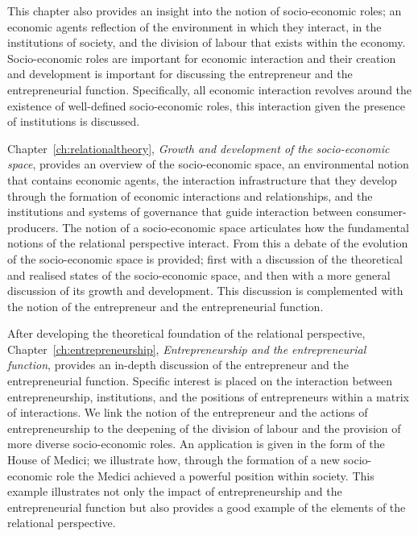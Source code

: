 This chapter also provides an insight into the notion of socio-economic roles; an economic agents reflection of the environment in which they interact, in the institutions of society, and the division of labour that exists within the economy. Socio-economic roles are important for economic interaction and their creation and development is important for discussing the entrepreneur and the entrepreneurial function. Specifically, all economic interaction revolves around the existence of well-defined socio-economic roles, this interaction given the presence of institutions is discussed.

Chapter~\ref{ch:relationaltheory}, \emph{Growth and development of the socio-economic space}, provides an overview of the socio-economic space, an environmental notion that contains economic agents, the interaction infrastructure that they develop through the formation of economic interactions and relationships, and the institutions and systems of governance that guide interaction between consumer-producers. The notion of a socio-economic space articulates how the fundamental notions of the relational perspective interact. From this a debate of the evolution of the socio-economic space is provided; first with a discussion of the theoretical and realised states of the socio-economic space, and then with a more general discussion of its growth and development. This discussion is complemented with the notion of the entrepreneur and the entrepreneurial function.

After developing the theoretical foundation of the relational perspective, Chapter~\ref{ch:entrepreneurship}, \emph{Entrepreneurship and the entrepreneurial function}, provides an in-depth discussion of the entrepreneur and the entrepreneurial function. Specific interest is placed on the interaction between entrepreneurship, institutions, and the positions of entrepreneurs within a matrix of interactions. We link the notion of the entrepreneur and the actions of entrepreneurship to the deepening of the division of labour and the provision of more diverse socio-economic roles. An application is given in the form of the House of Medici; we illustrate how, through the formation of a new socio-economic role the Medici achieved a powerful position within society. This example illustrates not only the impact of entrepreneurship and the entrepreneurial function but also provides a good example of the elements of the relational perspective.
